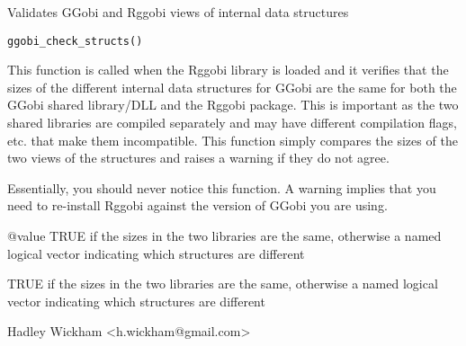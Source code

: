 \begin{Description}\relax
Validates GGobi and Rggobi views of internal data structures
\end{Description}
\begin{Usage}
\begin{verbatim}ggobi_check_structs()\end{verbatim}
\end{Usage}
\begin{Arguments}
\end{Arguments}
\begin{Details}\relax
This function is called when the Rggobi library is loaded and it verifies
that the sizes of the different internal data structures for GGobi are the
same for both the GGobi shared library/DLL and the Rggobi package. This is
important as the two shared libraries are compiled separately and may have
different compilation flags, etc. that make them incompatible. This
function simply compares the sizes of the two views of the structures and
raises a warning if they do not agree.

Essentially, you should never notice this function. A warning implies that
you need to re-install Rggobi against the version of GGobi you are using.

@value TRUE if the sizes in the two libraries are the same, otherwise a named logical vector indicating which structures are different
\end{Details}
\begin{Value}
TRUE if the sizes in the two libraries are the same, otherwise a named logical vector indicating which structures are different
\end{Value}
\begin{Author}\relax
Hadley Wickham <h.wickham@gmail.com>
\end{Author}
\begin{Examples}
\begin{ExampleCode}\end{ExampleCode}
\end{Examples}

